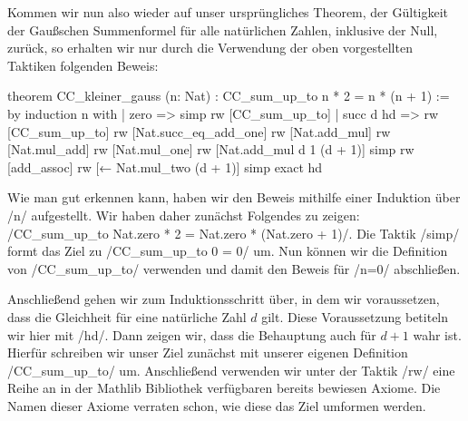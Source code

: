\documentclass[10pt]{article}
\begin{document}
\noindent Kommen wir nun also wieder auf unser ursprüngliches Theorem, der Gültigkeit der Gaußschen Summenformel für alle natürlichen Zahlen, inklusive der Null, zurück, so erhalten wir nur durch die Verwendung der oben vorgestellten Taktiken folgenden Beweis:
\begin{leancode}
theorem CC_kleiner_gauss (n: Nat) : CC_sum_up_to n * 2 = n * (n + 1) := by
  induction n with
    | zero => 
    simp
    rw [CC_sum_up_to]
    | succ d hd => 
    rw [CC_sum_up_to]
    rw [Nat.succ_eq_add_one]
    rw [Nat.add_mul]
    rw [Nat.mul_add]
    rw [Nat.mul_one]
    rw [Nat.add_mul d 1 (d + 1)]
    simp
    rw [add_assoc]
    rw [← Nat.mul_two (d + 1)]
    simp
    exact hd
\end{leancode}
\noindent Wie man gut erkennen kann, haben wir den Beweis mithilfe einer Induktion über \lean/n/ aufgestellt. Wir haben daher zunächst Folgendes zu zeigen: \lean/CC_sum_up_to Nat.zero * 2 = Nat.zero * (Nat.zero + 1)/. Die Taktik \lean/simp/ formt das Ziel zu \lean/CC_sum_up_to 0 = 0/ um. Nun können wir die Definition von \lean/CC_sum_up_to/ verwenden und damit den Beweis für \lean/n=0/ abschließen.

\noindent Anschließend gehen wir zum Induktionsschritt über, in dem wir voraussetzen, dass die Gleichheit für eine natürliche Zahl $d$ gilt. Diese Voraussetzung betiteln wir hier mit \lean/hd/. Dann zeigen wir, dass die Behauptung auch für $d+1$ wahr ist. Hierfür schreiben wir unser Ziel zunächst mit unserer eigenen Definition \lean/CC_sum_up_to/ um. Anschließend verwenden wir unter der Taktik \lean/rw/ eine Reihe an in der Mathlib Bibliothek verfügbaren bereits bewiesen Axiome. Die Namen dieser Axiome verraten schon, wie diese das Ziel umformen werden.
\end{document}
